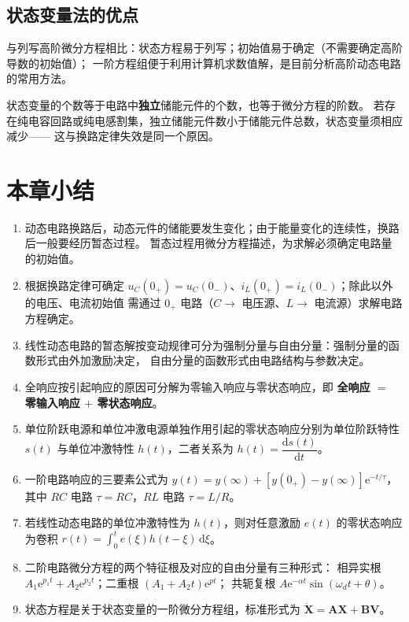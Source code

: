 \subsection{状态变量法的优点}
与列写高阶微分方程相比：状态方程易于列写；初始值易于确定（不需要确定高阶导数的初始值）；
一阶方程组便于利用计算机求数值解，是目前分析高阶动态电路的常用方法。

\begin{corepoint}{状态变量的个数等于电路中\textbf{独立}储能元件的个数，也等于微分方程的阶数。
若存在纯电容回路或纯电感割集，独立储能元件数小于储能元件总数，状态变量须相应减少——
这与换路定律失效是同一个原因。}
\end{corepoint}

\section{本章小结}
\begin{enumerate}
  \item 动态电路换路后，动态元件的储能要发生变化；由于能量变化的连续性，换路后一般要经历暂态过程。
        暂态过程用微分方程描述，为求解必须确定电路量的初始值。
  \item 根据换路定律可确定 $u_C(0_+)=u_C(0_-)$、$i_L(0_+)=i_L(0_-)$；除此以外的电压、电流初始值
        需通过 $0_+$ 电路（$C\to$ 电压源、$L\to$ 电流源）求解电路方程确定。
  \item 线性动态电路的暂态解按变动规律可分为强制分量与自由分量：强制分量的函数形式由外加激励决定，
        自由分量的函数形式由电路结构与参数决定。
  \item 全响应按引起响应的原因可分解为零输入响应与零状态响应，即
        \textbf{全响应 $=$ 零输入响应 $+$ 零状态响应}。
  \item 单位阶跃电源和单位冲激电源单独作用引起的零状态响应分别为单位阶跃特性 $s(t)$ 与单位冲激特性
        $h(t)$，二者关系为 $h(t)=\dfrac{\mathrm{d}s(t)}{\mathrm{d}t}$。
  \item 一阶电路响应的三要素公式为
        $y(t)=y(\infty)+\left[y(0_+)-y(\infty)\right]\mathrm{e}^{-t/\tau}$，
        其中 $RC$ 电路 $\tau=RC$，$RL$ 电路 $\tau=L/R$。
  \item 若线性动态电路的单位冲激特性为 $h(t)$，则对任意激励 $e(t)$ 的零状态响应为卷积
        $r(t)=\displaystyle\int_0^t e(\xi)h(t-\xi)\,\mathrm{d}\xi$。
  \item 二阶电路微分方程的两个特征根及对应的自由分量有三种形式：
        相异实根 $A_1\mathrm{e}^{p_1t}+A_2\mathrm{e}^{p_2t}$；二重根 $(A_1+A_2t)\mathrm{e}^{pt}$；
        共轭复根 $A\mathrm{e}^{-\alpha t}\sin(\omega_dt+\theta)$。
  \item 状态方程是关于状态变量的一阶微分方程组，标准形式为
        $\dot{\boldsymbol{X}}=\boldsymbol{A}\boldsymbol{X}+\boldsymbol{B}\boldsymbol{V}$。
\end{enumerate}

\endinput
